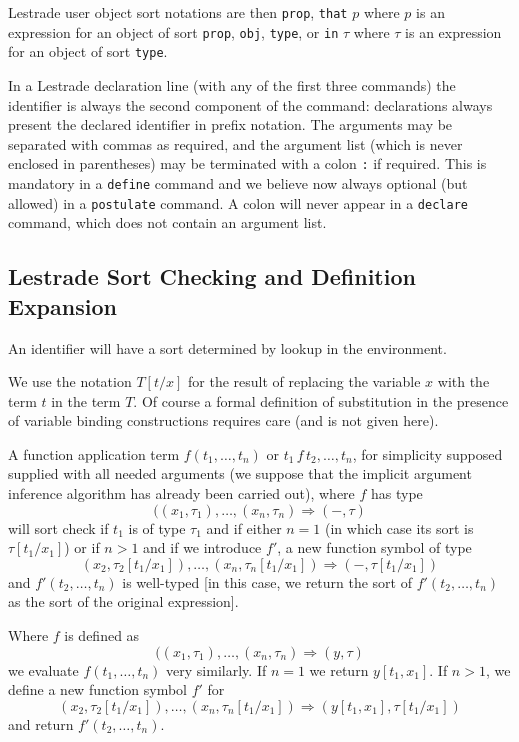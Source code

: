 \documentclass[12pt]{article}
\begin{document}
Lestrade user object sort notations are then {\tt prop}, {\tt that} $p$ where $p$ is an expression for an object of sort {\tt prop}, {\tt obj},
{\tt type}, or {\tt in} $\tau$ where $\tau$ is an expression for an object  of sort {\tt type}.

In a Lestrade declaration line (with any of the first three commands) the identifier is always the second component of the command:  declarations always present the declared identifier in prefix notation.  The arguments
may be separated with commas as required, and the argument list (which is never enclosed in parentheses) may be terminated with a colon {\tt :} if required.  This is mandatory in a {\tt define} command and we believe now always optional (but allowed) in a {\tt postulate} command.  A colon will never appear in a {\tt declare} command, which does not contain an argument list.

\subsection{Lestrade Sort Checking and Definition Expansion}

An identifier will have a sort determined by lookup in the environment.

We use the notation $T[t/x]$ for the result of replacing the variable $x$ with the term $t$ in the term $T$.  Of course a formal definition of substitution in the presence of variable binding constructions requires care (and is not given here).

A function application term $f(t_1,\ldots,t_n)$ or $t_1\, f\, t_2,\ldots,t_n$, for simplicity supposed supplied with all needed arguments (we suppose that the implicit argument inference algorithm has already been carried out), where $f$ has type $$((x_1,\tau_1),\ldots,(x_n,\tau_n) \Rightarrow (-,\tau)$$ will sort check if $t_1$ is of type $\tau_1$
and if either $n=1$ (in which case its sort is $\tau[t_1/x_1]$) or if $n>1$ and if we introduce $f'$, a new function symbol of type
$$(x_2,\tau_2[t_1/x_1]),\ldots,(x_n,\tau_n[t_1/x_1]) \Rightarrow (-,\tau[t_1/x_1])$$ and $f'(t_2,\ldots,t_n)$ is well-typed [in this case, we return the sort of $f'(t_2,\ldots,t_n)$ as the sort of the original expression].

Where $f$ is defined as  $$((x_1,\tau_1),\ldots,(x_n,\tau_n) \Rightarrow (y,\tau)$$ we evaluate $f(t_1,\ldots,t_n)$ very similarly.  If $n=1$ we return $y[t_1,x_1]$.  If $n>1$, we define a new function symbol $f'$ for $$(x_2,\tau_2[t_1/x_1]),\ldots,(x_n,\tau_n[t_1/x_1]) \Rightarrow (y[t_1,x_1],\tau[t_1/x_1])$$ and return $f'(t_2,\ldots,t_n)$.
\end{document}

